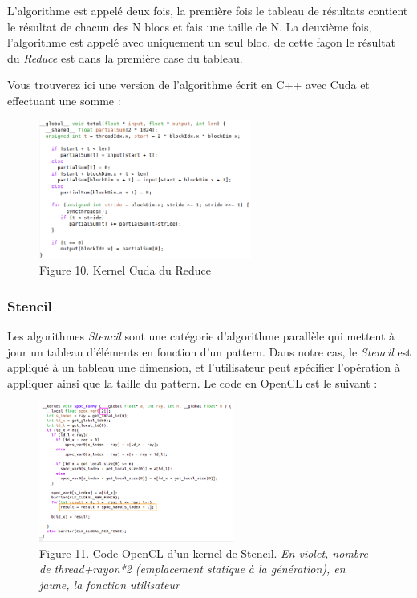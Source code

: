 \documentclass{report}
\begin{document}
L'algorithme est appelé deux fois, la première fois le tableau de résultats contient le résultat de chacun des N blocs et fais une taille de N. La deuxième fois, l'algorithme est appelé avec uniquement un seul bloc, de cette façon le résultat du \textit{Reduce} est dans la première case du tableau.\newline

Vous trouverez ici une version de l'algorithme écrit en C++ avec Cuda et effectuant une somme : \newline
 
\begin{figure}[!h]
\begin{center}
\includegraphics[height=130pt]{images_finales/reduce.png}
\end{center}
\caption{Figure 10. Kernel Cuda du Reduce}
\label{test10}
\end{figure}

\subsubsection{Stencil}
Les algorithmes \textit{Stencil} sont une catégorie d'algorithme parallèle qui mettent à jour un tableau d'éléments en fonction d'un pattern. Dans notre cas, le \textit{Stencil} est appliqué à un tableau une dimension, et l'utilisateur peut spécifier l'opération à appliquer ainsi que la taille du pattern. Le code en OpenCL est le suivant :\newline

\begin{figure}[!h]
\begin{center}
\includegraphics[height=130pt]{images_finales/Stencil_kernel.png}
\end{center}
\caption{Figure 11. Code OpenCL d'un kernel de Stencil. \textit{En violet, nombre de thread+rayon*2 (emplacement statique à la génération), en jaune, la fonction utilisateur}}
\label{test11}
\end{figure}
\newpage
\end{document}
